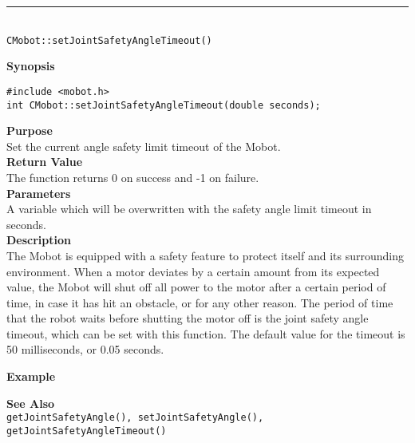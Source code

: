 \noindent
\vspace{5pt}
\rule{4.5in}{0.015in}\\
\noindent
{\LARGE \texttt{CMobot::setJointSafetyAngleTimeout()}}\\
{}

\noindent
{\bf Synopsis}
\vspace{-8pt}
\begin{verbatim}
#include <mobot.h>
int CMobot::setJointSafetyAngleTimeout(double seconds);
\end{verbatim}

\noindent
{\bf Purpose}\\
Set the current angle safety limit timeout of the Mobot.\\

\noindent
{\bf Return Value}\\
The function returns 0 on success and -1 on failure.\\

\noindent
{\bf Parameters}\\
A variable which will be overwritten with the safety angle limit timeout in seconds.\\

\noindent
{\bf Description}\\
The Mobot is equipped with a safety feature to protect itself and its surrounding
environment. When a motor deviates by a certain amount from its expected value, 
the Mobot will shut off all power to the motor after a certain period of time,
in case it has hit an obstacle, or for any other reason. The period of time that the
robot waits before shutting the motor off is the joint safety angle timeout, which
can be set with this function. The default value for the timeout is 50 milliseconds,
or 0.05 seconds.
 
\noindent
{\bf Example}\\
\noindent

\noindent
{\bf See Also}\\
\texttt{getJointSafetyAngle(), setJointSafetyAngle(), getJointSafetyAngleTimeout()}\\



